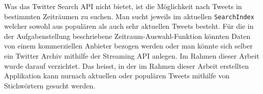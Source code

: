 Was das Twitter Search API nicht bietet, ist die Möglichkeit nach Tweets in bestimmten Zeiträumen zu suchen. Man sucht jeweils im aktuellen \lstinline$SearchIndex$ welcher sowohl aus populären als auch sehr aktuellen Tweets besteht. Für die in der Aufgabenstellung beschriebene Zeitraum-Auswahl-Funktion könnten Daten von einem kommerziellen Anbieter bezogen werden oder man könnte sich selber ein Twitter Archiv mithilfe der Streaming API \cite{twitterstreaming} anlegen. Im Rahmen dieser Arbeit wurde darauf verzichtet. Das heisst, in der im Rahmen dieser Arbeit erstellten Applikation kann \flqq nur\frqq nach aktuellen oder populären Tweets mithilfe von Stichwörtern gesucht werden. 